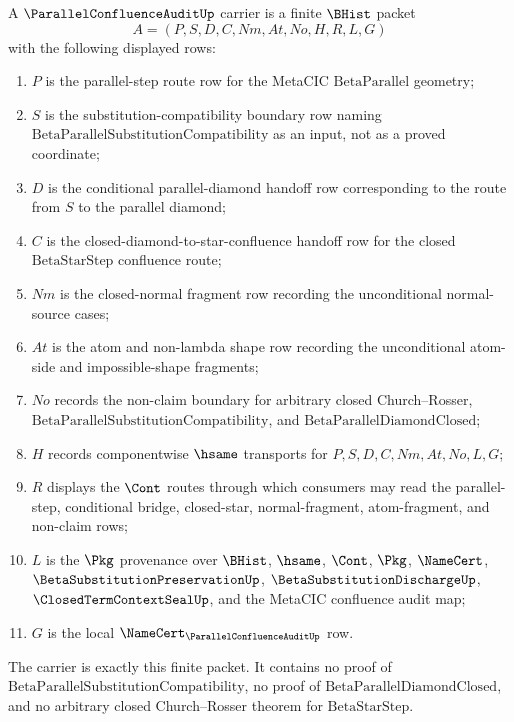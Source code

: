 \begin{definition}
\label{def:parallel-confluence-audit-carrier}
A $\ParallelConfluenceAuditUp$ carrier is a finite $\BHist$ packet
$$
A=(P,S,D,C,Nm,At,No,H,R,L,G)
$$
with the following displayed rows:
\begin{enumerate}
\item $P$ is the parallel-step route row for the MetaCIC $\mathrm{BetaParallel}$ geometry;
\item $S$ is the substitution-compatibility boundary row naming $\mathrm{BetaParallelSubstitutionCompatibility}$ as an input, not as a proved coordinate;
\item $D$ is the conditional parallel-diamond handoff row corresponding to the route from $S$ to the parallel diamond;
\item $C$ is the closed-diamond-to-star-confluence handoff row for the closed $\mathrm{BetaStarStep}$ confluence route;
\item $Nm$ is the closed-normal fragment row recording the unconditional normal-source cases;
\item $At$ is the atom and non-lambda shape row recording the unconditional atom-side and impossible-shape fragments;
\item $No$ records the non-claim boundary for arbitrary closed Church--Rosser, $\mathrm{BetaParallelSubstitutionCompatibility}$, and $\mathrm{BetaParallelDiamondClosed}$;
\item $H$ records componentwise $\hsame$ transports for $P,S,D,C,Nm,At,No,L,G$;
\item $R$ displays the $\Cont$ routes through which consumers may read the parallel-step, conditional bridge, closed-star, normal-fragment, atom-fragment, and non-claim rows;
\item $L$ is the $\Pkg$ provenance over $\BHist$, $\hsame$, $\Cont$, $\Pkg$, $\NameCert$, $\BetaSubstitutionPreservationUp$, $\BetaSubstitutionDischargeUp$, $\ClosedTermContextSealUp$, and the MetaCIC confluence audit map;
\item $G$ is the local $\NameCert_{\ParallelConfluenceAuditUp}$ row.
\end{enumerate}
The carrier is exactly this finite packet. It contains no proof of $\mathrm{BetaParallelSubstitutionCompatibility}$, no proof of $\mathrm{BetaParallelDiamondClosed}$, and no arbitrary closed Church--Rosser theorem for $\mathrm{BetaStarStep}$.
\end{definition}

